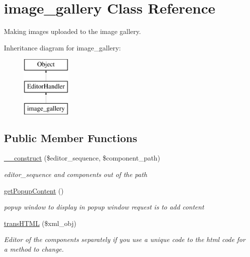 \hypertarget{classimage__gallery}{\section{image\-\_\-gallery Class Reference}
\label{classimage__gallery}
}


Making images uploaded to the image gallery.  


Inheritance diagram for image\-\_\-gallery\-:\begin{figure}[H]
\begin{center}
\leavevmode
\includegraphics[height=3.000000cm]{classimage__gallery}
\end{center}
\end{figure}
\subsection*{Public Member Functions}
\begin{DoxyCompactItemize}
\item 
\hyperlink{classimage__gallery_ad18a208377272f6bd790872553f214f9}{\-\_\-\-\_\-construct} (\$editor\-\_\-sequence, \$component\-\_\-path)
\begin{DoxyCompactList}\small\item\em editor\-\_\-sequence and components out of the path \end{DoxyCompactList}\item 
\hyperlink{classimage__gallery_a71ee76734048f188f3ec9caf692609b0}{get\-Popup\-Content} ()
\begin{DoxyCompactList}\small\item\em popup window to display in popup window request is to add content \end{DoxyCompactList}\item 
\hyperlink{classimage__gallery_a7e147e64f848be078e9171b061dd70ad}{trans\-H\-T\-M\-L} (\$xml\-\_\-obj)
\begin{DoxyCompactList}\small\item\em Editor of the components separately if you use a unique code to the html code for a method to change. \end{DoxyCompactList}\end{DoxyCompactItemize}
